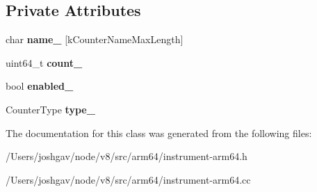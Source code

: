 \subsection*{Private Attributes}
\begin{DoxyCompactItemize}
\item 
char {\bfseries name\+\_\+} \mbox{[}k\+Counter\+Name\+Max\+Length\mbox{]}\hypertarget{classv8_1_1internal_1_1_counter_ab732284ee7259e2f53e74ba99d6a8c4c}{}\label{classv8_1_1internal_1_1_counter_ab732284ee7259e2f53e74ba99d6a8c4c}

\item 
uint64\+\_\+t {\bfseries count\+\_\+}\hypertarget{classv8_1_1internal_1_1_counter_afddc3fb4e19ad6e79367a82714da05bc}{}\label{classv8_1_1internal_1_1_counter_afddc3fb4e19ad6e79367a82714da05bc}

\item 
bool {\bfseries enabled\+\_\+}\hypertarget{classv8_1_1internal_1_1_counter_a9bc91b8f08eac4a8372c6de85137c7de}{}\label{classv8_1_1internal_1_1_counter_a9bc91b8f08eac4a8372c6de85137c7de}

\item 
Counter\+Type {\bfseries type\+\_\+}\hypertarget{classv8_1_1internal_1_1_counter_a17690fa4ac668135da3b040d71307fc0}{}\label{classv8_1_1internal_1_1_counter_a17690fa4ac668135da3b040d71307fc0}

\end{DoxyCompactItemize}


The documentation for this class was generated from the following files\+:\begin{DoxyCompactItemize}
\item 
/\+Users/joshgav/node/v8/src/arm64/instrument-\/arm64.\+h\item 
/\+Users/joshgav/node/v8/src/arm64/instrument-\/arm64.\+cc\end{DoxyCompactItemize}
